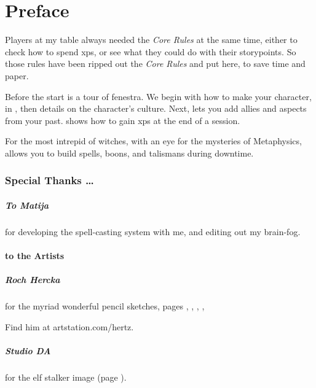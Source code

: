 \chapter{Preface}

\begin{multicols}{2}

Players at my table always needed the \textit{Core Rules} at the same time, either to check how to spend \glspl{xp}, or see what they could do with their \glspl{storypoint}.
So those rules have been ripped out the \textit{Core Rules} and put here, to save time and paper.

Before the start is a tour of \gls{fenestra}.
We begin with how to make your character, in , then details on the character's culture.
Next,  lets you add allies and aspects from your past.
 shows how to gain \glspl{xp} at the end of a session.

For the most intrepid of witches, with an eye for the mysteries of Metaphysics,  allows you to build spells, \glspl{boon}, and \glspl{talisman} during \gls{downtime}.

\subsection*{Special Thanks \ldots}

\paragraph{To Matija}
for developing the spell-casting system with me, and editing out my brain-fog.

\subsubsection*{to the Artists}

\paragraph{Roch Hercka} for the myriad wonderful pencil sketches, pages 
\pageref{Roch_Hercka/five_races}, 
\pageref{Roch_Hercka/illusion_trogdor}, 
\pageref{Roch_Hercka/xp-1}, 
\pageref{Roch_Hercka/xp-2}, 

Find him at artstation.com/hertz.

\paragraph{Studio DA}
for the elf stalker image
(page \pageref{Studio_DA/elf_stalker}).


\end{multicols}

